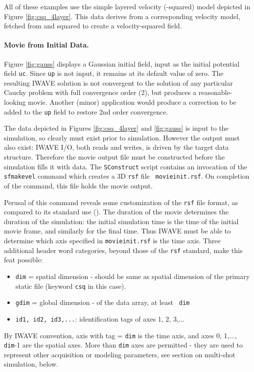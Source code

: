 All of these examples use the simple layered velocity
(-squared) model depicted in Figure \ref{fig:csq_4layer}. 
This data derives from a corresponding velocity model, fetched from
and squared to create a velocity-squared field.

\noindent \paragraph{Movie from Initial Data.} 
Figure \ref{fig:gauss}
displays a Gaussian initial field, input as the initial potential
field {\tt uc}.  Since  {\tt up} is not input, it remains at its
default value of zero. The resulting IWAVE solution is not convergent
to the solution of any particular Cauchy problem with full convergence
order (2), but produces a reasonable-looking movie. Another (minor)
application would produce a correction to be added to the {\tt up}
field to restore 2nd order convergence.

The data depicted in Figures \ref{fig:csq_4layer} and \ref{fig:gauss}
is input to the simulation, so clearly must exist prior to
simulation. However the output must also exist: IWAVE I/O, both reads
and writes, is driven by the target data structure. Therefore the
movie output file must be constructed before the simulation fills it
with data. The {\tt SConstruct} script contains an invocation of the
{\tt sfmakevel} command which creates a 3D {\tt rsf} file {\tt
  movieinit.rsf}. On completion of the command, this file holds the
movie output.

Perusal of this command reveals some customization of the {\tt rsf}
file format, as compared to its standard use (\cite{Madagascar}). The
duration of the movie determines the duration of the simulation: the
initial simulation time is the time of the initial movie frame, and
similarly for the final time. Thus IWAVE must be able to determine
which axis specified in {\tt movieinit.rsf} is the time axis. Three
additional header word categories, beyond those of the {\tt rsf}
standard, make this feat possible:
\begin{itemize}
\item {\tt dim} = spatial dimension - should be same as spatial
  dimension of the primary static file (keyword {\tt csq} in this
  case).
\item {\tt gdim} = global dimension - of the data array, at least {\tt
    dim}
\item {\tt id1, id2, id3,...}: identification tags of axes 1, 2, 3,...
\end{itemize}
By IWAVE convention, axis with tag = {\tt dim} is the time axis, and axes 0,
1,..., {\tt dim}-1 are the spatial axes. More than {\tt dim} axes are
permitted - they are used to represent other acquisition or modeling
parameters, see section on multi-shot simulation, below.

